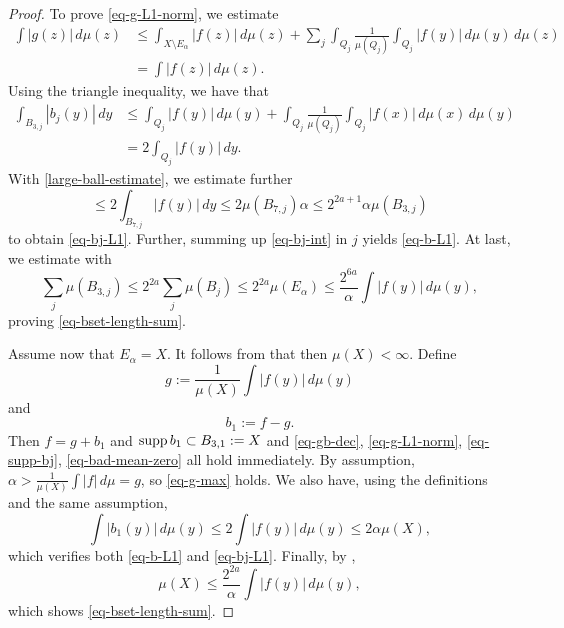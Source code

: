 \begin{proof}
To prove \eqref{eq-g-L1-norm}, we estimate
\begin{align*}
    \int |g(z)|\, d\mu(z) &\le \int_{X\setminus E_\alpha} |f(z)|\, d\mu(z) + \sum_{j} \int_{Q_j}\frac{1}{\mu(Q_j)}\int_{Q_j}|f(y)|\, d\mu(y)\,d\mu(z) \\
    &= \int |f(z)|\,d\mu(z).
\end{align*}
Using the triangle inequality, we have that
\begin{align}
    \label{eq-bj-int}
    \int_{B_{3,j}} |b_j(y)|\, dy &\le \int_{Q_j} |f(y)|\, d\mu(y) + \int_{Q_j} \frac{1}{\mu(Q_j)}\int_{Q_j} |f(x)|\, d\mu(x)\, d\mu(y) \\
    &= 2 \int_{Q_j} |f(y)|\, dy.
\end{align}
With \eqref{large-ball-estimate}, we estimate further
\begin{equation}
    \le 2 \int_{B_{7,j}} |f(y)|\, dy \le 2\mu(B_{7,j})\alpha \le 2^{2a+1} \alpha \mu(B_{3,j})
\end{equation}
to obtain \eqref{eq-bj-L1}.
Further, summing up \eqref{eq-bj-int} in $j$ yields \eqref{eq-b-L1}.
At last, we estimate with 
\begin{equation}
    \sum_j \mu(B_{3,j}) \le 2^{2a} \sum_j \mu(B_j) \le 2^{2a} \mu(E_\alpha) \le \frac{2^{6a}}{\alpha}\int |f(y)|\, d\mu(y),
\end{equation}
proving \eqref{eq-bset-length-sum}.

Assume now that $E_\alpha = X$. It follows from  that then $\mu(X)<\infty$.
Define
\begin{equation*}
    g := \frac{1}{\mu(X)} \int |f(y)|\,d\mu(y)
\end{equation*}
and
\begin{equation*}
    b_1 := f - g.
\end{equation*}
Then $f = g + b_1$ and $\operatorname{\operatorname{supp}} b_1 \subset B_{3,1}:=X$ and \eqref{eq-gb-dec}, \eqref{eq-g-L1-norm}, \eqref{eq-supp-bj}, \eqref{eq-bad-mean-zero} all hold immediately. By assumption, $\alpha>\frac{1}{\mu(X)}\int |f|\,d\mu = g$, so \eqref{eq-g-max} holds.
We also have, using the definitions and the same assumption,
\begin{equation}
    \int |b_1(y)|\, d\mu(y) \le 2 \int |f(y)|\,d\mu(y) \le 2\alpha\mu(X),
\end{equation}
which verifies both \eqref{eq-b-L1} and \eqref{eq-bj-L1}.
Finally, by ,
\begin{equation*}
    \mu(X) \le \frac{2^{2a}}{\alpha} \int |f(y)|\,d\mu(y),
\end{equation*}
which shows \eqref{eq-bset-length-sum}.
\end{proof}

